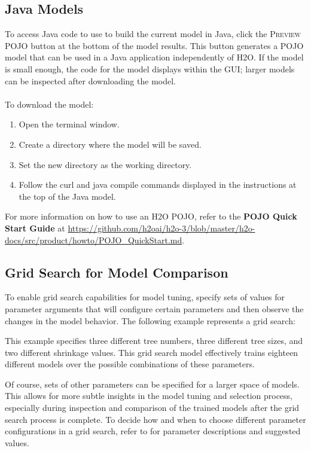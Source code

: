 \subsection{Java Models}

To access Java code to use to build the current model in Java, click the \textsc{Preview POJO} button at the
bottom of the model results. This button generates a POJO model that can be used in a Java application independently of H2O. If the model is small enough, the code for the model displays within the GUI; larger
models can be inspected after downloading the model.
\\
\\
To download the model:
\begin{enumerate}
\item Open the terminal window.
\item Create a directory where the model will be saved.
\item Set the new directory as the working directory.
\item Follow the curl and java compile commands displayed in the instructions at the top of the Java model.
\end{enumerate}

For more information on how to use an H2O POJO, refer to the \textbf{POJO Quick Start Guide} at {\url{https://github.com/h2oai/h2o-3/blob/master/h2o-docs/src/product/howto/POJO_QuickStart.md}}. 

\subsection{Grid Search for Model Comparison}
\label{ssec:Grid search}

To enable grid search capabilities for model tuning, specify sets of values for parameter arguments that will configure
certain parameters and then observe the changes in the model behavior. The following example represents a grid search:
\newpage
\waterExampleInR



This example specifies three different tree numbers, three different tree sizes, and two different shrinkage values.
This grid search model effectively trains eighteen different models over the possible combinations of these parameters.

Of course, sets of other parameters can be specified for a larger space of models. This allows for more subtle
insights in the model tuning and selection process, especially during inspection and comparison of the trained
models after the grid search process is complete. To decide how and when to choose different parameter configurations
in a grid search, refer to for parameter descriptions and suggested values.


